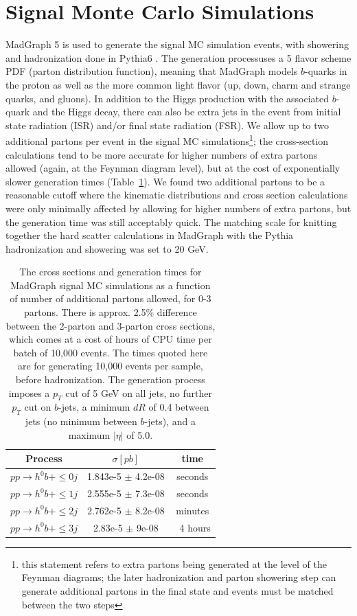 \section{Signal Monte Carlo Simulations}
MadGraph 5 \cite{MadGraph} is used to generate the signal MC simulation events, with showering and 
hadronization done in Pythia6 \cite{Pythia6}.  The generation processuses a 5 flavor scheme PDF 
(parton distribution function), meaning that MadGraph models $b$-quarks in the proton as 
well as the more common light flavor (up, down, charm and strange quarks, 
and gluons).  In addition to the Higgs production with the associated $b$-quark and 
the Higgs decay, there can also be extra jets in the event from initial state radiation (ISR) 
and/or final state radiation (FSR).  We allow up to two additional partons per 
event in the signal MC simulations\footnote{this statement refers to extra partons being
generated at the level of the Feynman diagrams; the later hadronization and parton showering step can generate additional
partons in the final state and events must be matched between the two steps}; 
the cross-section calculations tend to be more 
accurate for higher numbers of extra partons allowed (again, at the Feynman diagram level), 
but at the cost of exponentially slower 
generation times (Table~\ref{tab:mg_times}).  We found two additional partons to be a reasonable cutoff where the kinematic
distributions and cross section calculations were only minimally 
affected by allowing for higher numbers of extra partons, but the generation 
time was still acceptably quick.  The matching scale for knitting together the hard scatter
calculations in MadGraph with the Pythia hadronization and showering was set to 20 GeV.

\begin{table}
   \caption{The cross sections and generation times for MadGraph signal MC simulations as a function
   of number of additional partons allowed, for 0-3 partons.  There is approx. 2.5\%
   difference between the 2-parton and 3-parton cross sections, which comes at a cost
   of hours of CPU time per batch of 10,000 events.  The times quoted here are for generating 10,000 events per 
   sample, before hadronization.  The generation process imposes a $p_T$ cut of 5 GeV on all jets,
   no further $p_T$ cut on $b$-jets, a minimum $dR$ of 0.4 between jets (no minimum between
   $b$-jets), and a maximum $|\eta|$ of 5.0. \label{tab:mg_times}} 
    \center
    \begin{tabular}{ c c c } \hline\hline
    Process & $\sigma [pb]$ & time \\ \hline
    $pp\rightarrow h^0b + \leq 0j$ & 1.843e-5 $\pm$ 4.2e-08 & seconds \\
    $pp\rightarrow h^0b + \leq 1j$ & 2.555e-5 $\pm$ 7.3e-08 & seconds \\
    $pp\rightarrow h^0b + \leq 2j$ & 2.762e-5 $\pm$ 8.2e-08 & minutes \\
    $pp\rightarrow h^0b + \leq 3j$ & 2.83e-5 $\pm$ 9e-08 & $~$ 4 hours \\  \hline
    \end{tabular}
\end{table}

